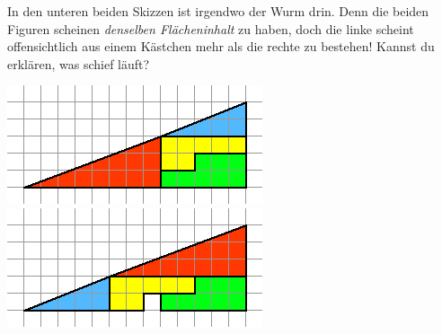 \documentclass{../zirkelblatt}
\begin{document}
In den unteren beiden Skizzen ist irgendwo der Wurm drin. Denn die beiden
Figuren scheinen \emph{denselben Flächeninhalt} zu haben, doch die linke
scheint offensichtlich aus einem Kästchen mehr als die rechte zu bestehen!
Kannst du erklären, was schief läuft?

\begin{center}
  \includegraphics[scale=0.8]{ein-kaestchen-verschwindet-1}
  \hfill
  \includegraphics[scale=0.8]{ein-kaestchen-verschwindet-2}
\end{center}


\vfill
\end{document}
